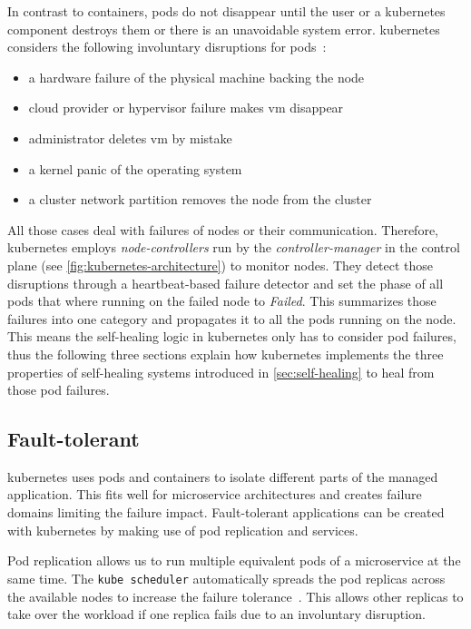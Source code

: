  In contrast to containers, pods do not disappear until the user or a \gls{kubernetes} component destroys them or there is an unavoidable system error.
  \Gls{kubernetes} considers the following involuntary disruptions for pods~\cite{kubernetesdoc}:

  \begin{itemize}
    \item a hardware failure of the physical machine backing the node
    \item cloud provider or hypervisor failure makes \gls{vm} disappear
    \item administrator deletes \gls{vm} by mistake
    \item a kernel panic of the operating system
    \item a cluster network partition removes the node from the cluster
  \end{itemize}

  All those cases deal with failures of nodes or their communication.
  Therefore, \gls{kubernetes} employs \textit{node-controllers} run by the \textit{controller-manager} in the control plane (see \cref{fig:kubernetes-architecture}) to monitor nodes.
  They detect those disruptions through a heartbeat-based failure detector and set the phase of all pods that where running on the failed node to \textit{Failed}.
  This summarizes those failures into one category and propagates it to all the pods running on the node.
  This means the self-healing logic in \gls{kubernetes} only has to consider pod failures,
  thus the following three sections explain how \gls{kubernetes} implements the three properties of self-healing systems introduced in \cref{sec:self-healing} to heal from those pod failures.

\subsection{Fault-tolerant}\label{sec:self-healing-kubernetes:fault-tolerant}
  \Gls{kubernetes} uses pods and containers to isolate different parts of the managed application.
  This fits well for microservice architectures and creates failure domains limiting the failure impact.
  Fault-tolerant applications can be created with \gls{kubernetes} by making use of pod replication and \glspl{service}.

  Pod replication allows us to run multiple equivalent pods of a microservice at the same time.
  The \texttt{kube scheduler} automatically spreads the pod replicas across the available nodes to increase the failure tolerance~\cite{kubernetesdoc}.
  This allows other replicas to take over the workload if one replica fails due to an involuntary disruption.


